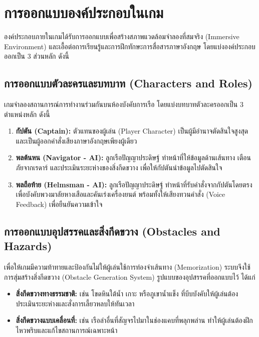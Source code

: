 
\section{การออกแบบองค์ประกอบในเกม}

องค์ประกอบภายในเกมได้รับการออกแบบเพื่อสร้างสภาพแวดล้อมจำลองที่สมจริง (Immersive Environment) และเอื้อต่อการเรียนรู้และการฝึกทักษะการสื่อสารภาษาอังกฤษ โดยแบ่งองค์ประกอบออกเป็น 3 ส่วนหลัก ดังนี้

\subsection{การออกแบบตัวละครและบทบาท (Characters and Roles)}

เกมจำลองสถานการณ์การทำงานร่วมกันบนห้องบังคับการเรือ โดยแบ่งบทบาทตัวละครออกเป็น 3 ตำแหน่งหลัก ดังนี้

\begin{enumerate}[label=\arabic*)]
    \item \textbf{กัปตัน (Captain):} ตัวแทนของผู้เล่น (Player Character) เป็นผู้มีอำนาจตัดสินใจสูงสุดและเป็นผู้ออกคำสั่งเสียงภาษาอังกฤษเพียงผู้เดียว
    \item \textbf{พลต้นหน (Navigator - AI):} ลูกเรือปัญญาประดิษฐ์ ทำหน้าที่ให้ข้อมูลด้านเส้นทาง เตือนภัยจากเรดาร์ และประเมินระยะห่างของสิ่งกีดขวาง เพื่อให้กัปตันนำข้อมูลไปตัดสินใจ
    \item \textbf{พลถือท้าย (Helmsman - AI):} ลูกเรือปัญญาประดิษฐ์ ทำหน้าที่รับคำสั่งจากกัปตันโดยตรงเพื่อบังคับพวงมาลัยหางเสือและคันเร่งเครื่องยนต์ พร้อมทั้งให้เสียงทวนคำสั่ง (Voice Feedback) เพื่อยืนยันความเข้าใจ
\end{enumerate}

\subsection{การออกแบบอุปสรรคและสิ่งกีดขวาง (Obstacles and Hazards)}

เพื่อให้เกมมีความท้าทายและป้องกันไม่ให้ผู้เล่นใช้การท่องจำเส้นทาง (Memorization) ระบบจึงใช้การสุ่มสร้างสิ่งกีดขวาง (Obstacle Generation System) รูปแบบของอุปสรรคที่ออกแบบไว้ ได้แก่

\begin{itemize}
    \item \textbf{สิ่งกีดขวางทางธรรมชาติ:} เช่น โขดหินใต้น้ำ เกาะ หรือภูเขาน้ำแข็ง ที่บีบบังคับให้ผู้เล่นต้องประเมินระยะห่างและสั่งการเลี้ยวหลบให้ทันเวลา
    \item \textbf{สิ่งกีดขวางแบบเคลื่อนที่:} เช่น เรือลำอื่นที่สัญจรไปมาในช่องแคบที่พลุกพล่าน ทำให้ผู้เล่นต้องฝึกไหวพริบและแก้ไขสถานการณ์เฉพาะหน้า
\end{itemize}

